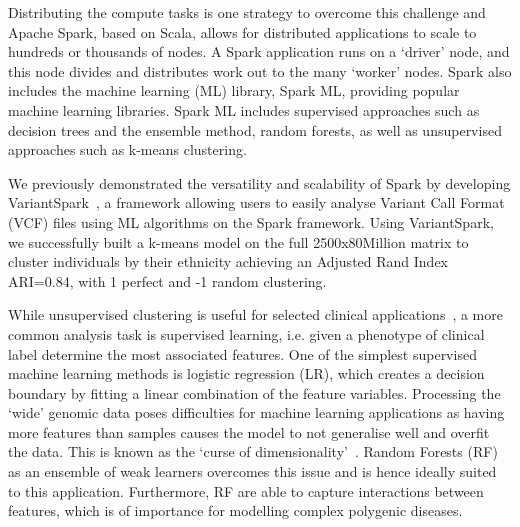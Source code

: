 \documentclass[10pt,letterpaper]{article}
\begin{document}


Distributing the compute tasks is one strategy to overcome this challenge and Apache Spark, based on Scala, allows for distributed applications to scale to hundreds or thousands of nodes.
A Spark application runs on a `driver' node, and this node divides and distributes work out to the many `worker' nodes.
Spark also includes the machine learning (ML) library, Spark ML, providing popular machine learning libraries. 
Spark ML includes supervised approaches such as decision trees and the ensemble method, random forests, as well as unsupervised approaches such as k-means clustering.

We previously demonstrated the versatility and scalability of Spark by developing VariantSpark~\cite{OBrien2015}, a framework allowing users to easily analyse Variant Call Format (VCF) files using ML algorithms on the Spark framework. 
Using VariantSpark, we successfully built a k-means model on the full 2500x80Million matrix to cluster individuals by their ethnicity achieving an Adjusted Rand Index ARI=0.84, with 1 perfect and -1 random clustering. 


While unsupervised clustering is useful for selected clinical applications~\cite{Li2015}, a more common analysis task is supervised learning, i.e. given a phenotype of clinical label determine the most associated features. 
One of the simplest supervised machine learning methods is logistic regression (LR), which creates a decision boundary by fitting a linear combination of the feature variables.
Processing the `wide' genomic data poses difficulties for machine learning applications as having more features than samples causes the model to not generalise well and overfit the data. 
This is known as the `curse of dimensionality'~\cite{Bauer2014}. 
Random Forests (RF) as an ensemble of weak learners overcomes this issue and is hence ideally suited to this application. 
Furthermore, RF are able to capture interactions between features, which is of importance for modelling complex polygenic diseases.
\end{document}
